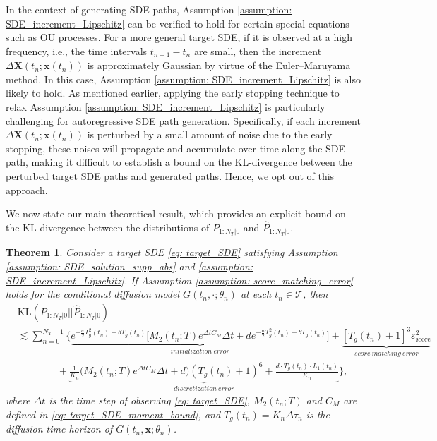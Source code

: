 \documentclass[11pt]{article}
\newtheorem{theorem}{Theorem}
\newcommand{\bX}{\mathbf{X}}
\newcommand{\bx}{\mathbf{x}}
\newcommand{\genP}{\hat P}
\newcommand{\KL}{\text{KL}}
\begin{document}
In the context of generating SDE paths, Assumption \ref{assumption: SDE_increment_Lipschitz} can be verified to hold for certain special equations such as OU processes. For a more general target SDE, if it is observed at a high frequency, i.e., the time intervals $t_{n+1} - t_n$ are small, then the increment $\Delta\bX(t_n; \bx(t_n))$ is approximately Gaussian by virtue of the Euler--Maruyama method. In this case, Assumption \ref{assumption: SDE_increment_Lipschitz} is also likely to hold. As mentioned earlier, applying the early stopping technique to relax Assumption \ref{assumption: SDE_increment_Lipschitz} is particularly challenging for autoregressive SDE path generation. Specifically, if each increment $\Delta\bX(t_n; \bx(t_n))$ is perturbed by a small amount of noise due to the early stopping, these noises will propagate and accumulate over time along the SDE path, making it difficult to establish a bound on the KL-divergence between the perturbed target SDE paths and generated paths. Hence, we opt out of this approach.






We now state our main theoretical result, which provides an explicit bound on the KL-divergence between the distributions of $P_{1:N_T|0}$ and $\genP_{1:N_T|0}$.


\begin{theorem}\label{thm: SDE_diffusion_convergence}
    Consider a target SDE \eqref{eq: target_SDE} satisfying Assumption \ref{assumption: SDE_solution_supp_abs} and \ref{assumption: SDE_increment_Lipschitz}. If Assumption \ref{assumption: score_matching_error} holds for the conditional diffusion model $G(t_n, \cdot; \theta_n)$ at each $t_n\in\mathcal{T}$, then
    \begin{align*}
    &\KL(P_{1:N_T|0} || \genP_{1:N_T|0}) \\
    & \lesssim  \sum_{n=0}^{N_T - 1} \bigg\{\underbrace{e^{-\frac{a}{2}T_g^2(t_n) - bT_g(t_n)}\big[M_2(t_{n}; T) e^{\Delta tC_M}\Delta t + de^{-\frac{a}{2}T_g^2(t_n) - bT_g(t_n)}\big]}_{initialization\ error} + \underbrace{[T_g(t_n) + 1]^3\varepsilon_{\text{score}}^2}_{score\ matching\ error} \\
    &\quad \qquad \quad+ \underbrace{\frac{1}{K_n}\big(M_2(t_{n}; T) e^{\Delta tC_M}\Delta t + d\big)(T_g(t_n) + 1)^6 + \frac{d \cdot T_g(t_n) \cdot L_1(t_n)}{K_n}}_{discretization\ error}\bigg\},
    \end{align*}
    where $\Delta t$ is the time step of observing \eqref{eq: target_SDE}, $M_2(t_n; T)$ and $C_M$ are defined in \eqref{eq: target_SDE_moment_bound}, and $T_g(t_n)=K_n\Delta\tau_n$ is the diffusion time horizon of $G(t_n, \bx; \theta_n)$.
\end{theorem}
\end{document}
